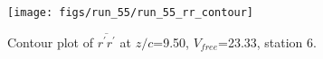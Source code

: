 \begin{figure}[H]
\centering
\texttt{[image: figs/run\_55/run\_55\_rr\_contour]}
\caption{Contour plot of $\overline{r^\prime r^\prime}$ at $z/c$=9.50, $V_{free}$=23.33, station 6.}
\label{fig:run_55_rr_contour}
\end{figure}


